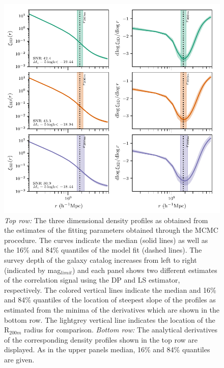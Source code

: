 \documentclass[a4paper,fleqn,usenatbib]{mnras}
\begin{document}
\begin{figure}
    \includegraphics[width= \textwidth]{3D_graphs.pdf}
\caption{\textit{Top row: }The three dimensional density profiles as obtained from the estimates of the fitting parameters obtained through the MCMC procedure. The curves indicate the median (solid lines) as well as the 16\% and 84\% quantiles of the model fit (dashed lines). The survey depth of the galaxy catalog increases from left to right (indicated by mag$_{limit}$) and each panel shows two different estimates of the correlation signal using the DP and LS estimator, respectively. The colored vertical lines indicate the median and 16\% and 84\% quantiles of the location of steepest slope of the profiles as estimated from the minima of the derivatives which are shown in the bottom row. The lightgrey vertical line indicates the location of the R$_{200m}$ radius for comparison. \textit{Bottom row: } The analytical derivatives of the corresponding density profiles shown in the top row are displayed. As in the upper panels median, 16\% and 84\% quantiles are given.}
   \label{fig:3D_graphs} 
\end{figure}
\end{document}
